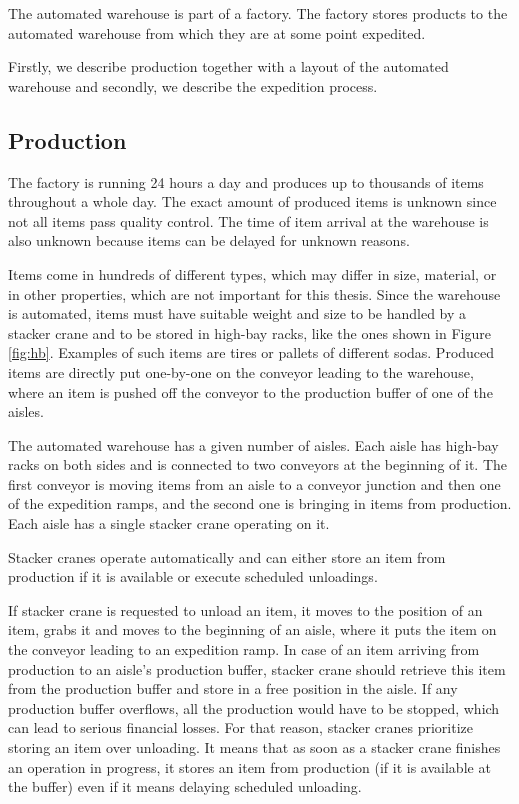 \documentclass{ctuthesis}
\begin{document}
The automated warehouse is part of a factory. The factory stores products to the automated warehouse from which they are at some point expedited. 

Firstly, we describe production together with a layout of the automated warehouse and secondly, we describe the expedition process.

\subsection{Production} 
The factory is running 24 hours a day and produces up to thousands of items throughout a whole day. The exact amount of produced items is unknown since not all items pass quality control. The time of item arrival at the warehouse is also unknown because items can be delayed for unknown reasons.

Items come in hundreds of different types, which may differ in size, material, or in other properties, which are not important for this thesis. Since the warehouse is automated, items must have suitable weight and size to be handled by a stacker crane and to be stored in high-bay racks, like the ones shown in Figure \ref{fig:hb}. Examples of such items are tires or pallets of different sodas. Produced items are directly put one-by-one on the conveyor leading to the warehouse, where an item is pushed off the conveyor to the production buffer of one of the aisles.

The automated warehouse has a given number of aisles. Each aisle has high-bay racks on both sides and is connected to two conveyors at the beginning of it. The first conveyor is moving items from an aisle to a conveyor junction and then one of the expedition ramps, and the second one is bringing in items from production. Each aisle has a single stacker crane operating on it.

Stacker cranes operate automatically and can either store an item from production if it is available or execute scheduled unloadings. 

If stacker crane is requested to unload an item, it moves to the position of an item, grabs it and moves to the beginning of an aisle, where it puts the item on the conveyor leading to an expedition ramp. In case of an item arriving from production to an aisle's production buffer, stacker crane should retrieve this item from the production buffer and store in a free position in the aisle. If any production buffer overflows, all the production would have to be stopped, which can lead to serious financial losses. For that reason, stacker cranes prioritize storing an item over unloading. It means that as soon as a stacker crane finishes an operation in progress, it stores an item from production (if it is available at the buffer) even if it means delaying scheduled unloading.
\end{document}
